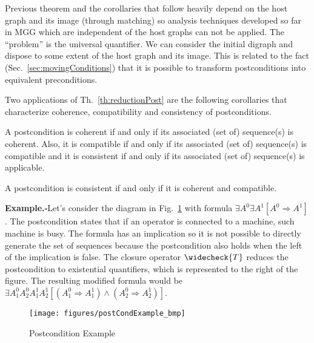 \documentclass{fundam}
\begin{document}
Previous theorem and the corollaries that follow heavily depend on the
host graph and its image (through matching) so analysis techniques
developed so far in MGG which are independent of the host graphs can
not be applied. The ``problem'' is the universal quantifier. We can
consider the initial digraph and dispose to some extent of the host
graph and its image. This is related to the fact
(Sec.~\ref{sec:movingConditions}) that it is possible to transform
postconditions into equivalent preconditions.

Two applications of Th.~\ref{th:reductionPost} are the
following corollaries that characterize coherence, compatibility and
consistency of postconditions.

\begin{corollary}
  \label{cor:equivPostAC_seqs}
  A postcondition is coherent if and only if its associated (set of)
  sequence(s) is coherent.  Also, it is compatible if and only if its
  associated (set of) sequence(s) is compatible and it is consistent
  if and only if its associated (set of) sequence(s) is applicable.
\end{corollary}



\begin{corollary}
  \label{cor:postcondConsCohComp}
  A postcondition is consistent if and only if it is coherent and
  compatible.
\end{corollary}





\noindent \textbf{Example.}$\square$Let's consider the diagram in
Fig.~\ref{fig:final_example_GC} with formula $\exists A^0 \exists A^1
[A^0 \Rightarrow A^1]$. The postcondition states that if an operator
is connected to a machine, such machine is busy. The formula has an
implication so it is not possible to directly generate the set of
sequences because the postcondition also holds when the left of the
implication is false. The closure operator $\widecheck{T}$ reduces the
postcondition to existential quantifiers, which is represented to the
right of the figure. The resulting modified formula would be  $\exists
A^0_1 A^0_2 A^1_1 A^1_2 [ (A^0_1 \Rightarrow A^1_1) \wedge (A^0_2
\Rightarrow A^1_2)]$.

\begin{figure}[htbp]
  \centering
  \texttt{[image: figures/postCondExample\_bmp]}
  \caption{Postcondition Example}
  \label{fig:final_example_GC}
\end{figure}
\end{document}
